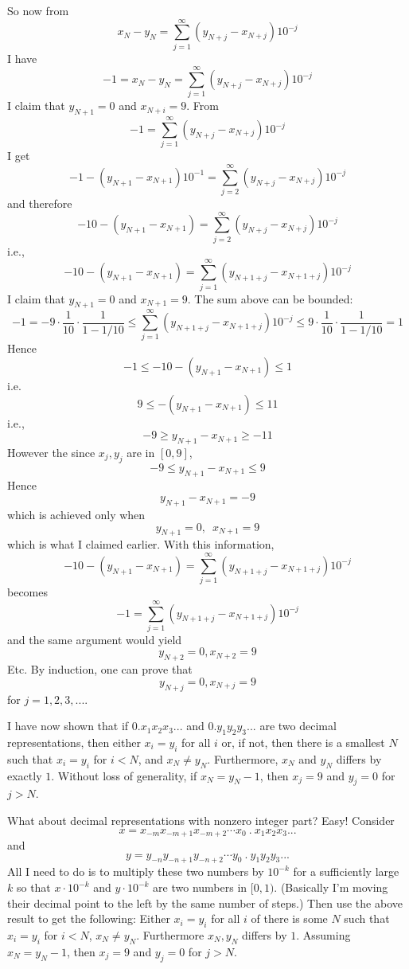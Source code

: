So now from
\[
x_N - y_N = \sum_{j=1}^\infty (y_{N + j} - x_{N+j})10^{-j}
\]
I have
\[
-1 = x_N - y_N = \sum_{j=1}^\infty (y_{N+j} - x_{N+j})10^{-j}
\]
I claim that $y_{N+1} = 0$ and $x_{N+i} = 9$.
From
\[
-1 = \sum_{j=1}^\infty (y_{N+j} - x_{N+j})10^{-j}
\]
I get
\[
-1 - (y_{N+1} - x_{N+1})10^{-1} = \sum_{j=2}^\infty (y_{N+j} - x_{N+j})10^{-j}
\]
and therefore
\[
-10 - (y_{N+1} - x_{N+1}) = \sum_{j=2}^\infty (y_{N+j} - x_{N+j})10^{-j}
\]
i.e.,
\[
-10 - (y_{N+1} - x_{N+1}) = \sum_{j=1}^\infty (y_{N+1+j} - x_{N+1+j})10^{-j}
\]
I claim that $y_{N+1} = 0$ and $x_{N+1} = 9$.
The sum above can be bounded:
\[
-1 = 
-9 \cdot \frac{1}{10} \cdot \frac{1}{1 - 1/10}
\leq
\sum_{j=1}^\infty (y_{N+1+j} - x_{N+1+j})10^{-j}
\leq
9 \cdot \frac{1}{10} \cdot \frac{1}{1 - 1/10}
= 1
\]
Hence
\[
-1 \leq -10 - (y_{N+1} - x_{N+1}) \leq 1 
\]
i.e. 
\[
9 \leq - (y_{N+1} - x_{N+1}) \leq 11 
\]
i.e.,
\[
-9 \geq y_{N+1} - x_{N+1} \geq -11 
\]
However the since $x_{j}, y_{j}$ are in $[0, 9]$,
\[
-9 \leq y_{N+1} - x_{N+1} \leq 9
\]
Hence
\[
y_{N+1} - x_{N+1} = -9
\]
which is achieved only when
\[
y_{N+1} = 0, \,\,\, x_{N+1} = 9
\]
which is what I claimed earlier.
With this information,
\[
-10 - (y_{N+1} - x_{N+1}) = \sum_{j=1}^\infty (y_{N+1+j} - x_{N+1+j})10^{-j}
\]
becomes
\[
-1 = \sum_{j=1}^\infty (y_{N+1+j} - x_{N+1+j})10^{-j}
\]
and the same argument would yield
\[
y_{N+2} = 0, x_{N+2} = 9
\]
Etc.
By induction, one can prove that
\[
y_{N+j} = 0, x_{N+j} = 9
\]
for $j = 1, 2, 3, ...$.

I have now shown that if
$0.x_1x_2x_3...$
and
$0.y_1y_2y_3...$
are two decimal representations, then
either $x_i = y_i$ for all $i$ or, if not,
then there is a smallest $N$ such that
$x_i = y_i$ for $i < N$,
and $x_N \neq y_N$.
Furthermore,
$x_N$ and $y_N$ differs by exactly $1$.
Without loss of generality, if $x_N = y_N - 1$, then
$x_j = 9$ and $y_j = 0$ for $j > N$.

What about decimal representations with nonzero integer part?
Easy!
Consider
\[
x = x_{-m}x_{-m+1}x_{-m+2}\cdots x_0 \ . \ x_1x_2x_3...
\]
and
\[
y = y_{-n}y_{-n+1}y_{-n+2}\cdots y_0 \ . \ y_1y_2y_3...
\]
All I need to do is to multiply these two numbers
by $10^{-k}$ for a sufficiently large $k$
so that $x\cdot 10^{-k}$ and $y \cdot 10^{-k}$ are
two numbers in $[0,1)$.
  (Basically I'm moving their decimal point to the left
  by the same number of steps.)
  Then use the above result to get the following:
  Either $x_i = y_i$ for all $i$ of
  there is some $N$ such that $x_i = y_i$ for $i < N$,
  $x_N \neq y_N$.
  Furthermore $x_N, y_N$ differs by $1$.
  Assuming $x_N = y_N - 1$, then
  $x_j = 9$ and $y_j = 0$ for $j > N$.

